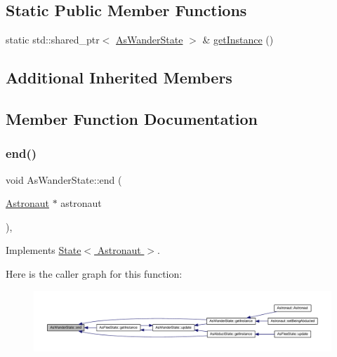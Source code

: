 \subsection*{Static Public Member Functions}
\begin{DoxyCompactItemize}
\item 
static std\+::shared\+\_\+ptr$<$ \hyperlink{class_as_wander_state}{As\+Wander\+State} $>$ \& \hyperlink{class_as_wander_state_aec2c7973e9d2e7c3087a1a5c486a2bc4}{get\+Instance} ()
\end{DoxyCompactItemize}
\subsection*{Additional Inherited Members}


\subsection{Member Function Documentation}
\mbox{\label{class_as_wander_state_ab225e3074b252027cfd84f8fe9171e1c}} 
\subsubsection{\texorpdfstring{end()}{end()}}
{\footnotesize\ttfamily void As\+Wander\+State\+::end (\begin{DoxyParamCaption}\item[{\hyperlink{class_astronaut}{Astronaut} $\ast$}]{astronaut }\end{DoxyParamCaption})\hspace{0.3cm}{\ttfamily [override]}, {\ttfamily [virtual]}}



Implements \hyperlink{class_state_a97d058722f988c008e912a0e5ec879b3}{State$<$ Astronaut $>$}.

Here is the caller graph for this function\+:
\nopagebreak
\begin{figure}[H]
\begin{center}
\leavevmode
\includegraphics[width=350pt]{class_as_wander_state_ab225e3074b252027cfd84f8fe9171e1c_icgraph}
\end{center}
\end{figure}
\mbox{\label{class_as_wander_state_aec2c7973e9d2e7c3087a1a5c486a2bc4}} 
